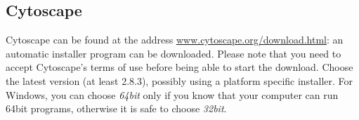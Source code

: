\subsection{Cytoscape}\label{sec:install-cytoscape}
Cytoscape can be found at the address \url{www.cytoscape.org/download.html}: an automatic installer
program can be downloaded. Please note that you need to accept Cytoscape's terms of use before being able to start the download.
Choose the latest version (at least 2.8.3), possibly using a platform specific installer. For Windows, you can choose \emph{64bit} only
if you know that your computer can run 64bit programs, otherwise it is safe to choose \emph{32bit}.

